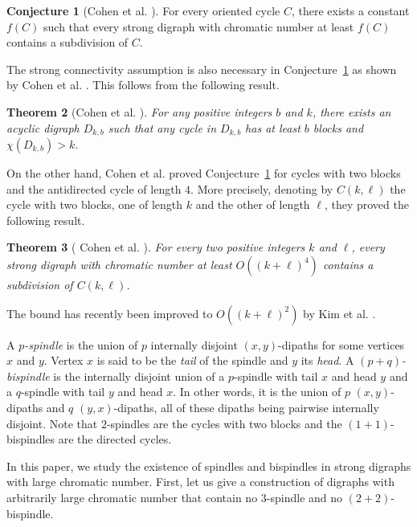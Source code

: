\documentclass[utf8,10pt]{article}
\theoremstyle{plain}
\newtheorem{theorem}{Theorem}
\theoremstyle{definition}
\newtheorem{conjecture}[theorem]{Conjecture}
\theoremstyle{remark}
\begin{document}
\begin{conjecture}[Cohen et al.  \cite{CHLN16}]\label{conj:cycle-sub}
For every oriented cycle $C$, there exists a constant $f(C)$ such that every strong digraph with chromatic number at least $f(C)$ contains a subdivision of $C$.
\end{conjecture}

The strong connectivity assumption is also necessary in Conjecture~\ref{conj:cycle-sub} as shown by Cohen et al.  \cite{CHLN16}. This follows from  the following result.
\begin{theorem}[Cohen et al.  \cite{CHLN16}]\label{dkb}
For any positive integers $b$ and $k$, there exists an acyclic digraph $D_{k,b}$ such that any cycle in $D_{k,b}$ has at least $b$ blocks and $\chi(D_{k,b}) > k$.
\end{theorem}




On the other hand, Cohen et al.  \cite{CHLN16} proved Conjecture~\ref{conj:cycle-sub} for cycles with two blocks and the antidirected cycle of length $4$.
More precisely, denoting by $C(k,\ell)$ the cycle with two blocks, one of length $k$ and the other of length $\ell$,
they proved the following result.
\begin{theorem}[ Cohen et al. \cite{CHLN16}]\label{th:ckl}
For every two positive integers $k$ and $\ell$, every strong digraph with chromatic number at least $O((k+\ell)^4)$ contains a subdivision of $C(k,\ell)$.
\end{theorem} 
The bound has recently been improved to $O((k+\ell)^2)$  by Kim et al. \cite{KKPM}.  


\medskip

A {\it $p$-spindle} is the union of $p$ internally disjoint $(x,y)$-dipaths for some vertices $x$ and $y$. Vertex $x$ is said to be the {\it tail} of the spindle and $y$ its {\it head}.
A {\it $(p+q)$-bispindle} is the internally disjoint union of a $p$-spindle
with tail $x$ and head $y$ and a  $q$-spindle with tail $y$ and head $x$.
In other words, it is the union of $p$  $(x,y)$-dipaths and $q$ $(y,x)$-dipaths, all of these dipaths being pairwise internally disjoint.
Note that $2$-spindles are the cycles with two blocks and the $(1+1)$-bispindles are the directed cycles.

In this paper, we study the existence of spindles and bispindles in strong digraphs with large chromatic number.
First, let us give a construction of digraphs with arbitrarily large chromatic number that contain no $3$-spindle and no $(2+2)$-bispindle. 
\end{document}
